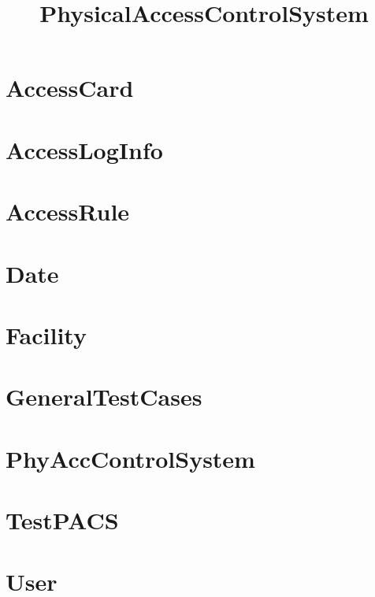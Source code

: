 \documentclass{article}
\begin{document}
\title{PhysicalAccessControlSystem}
\author{}
\maketitle
\tableofcontents

\section{AccessCard}

\section{AccessLogInfo}

\section{AccessRule}

\section{Date}

\section{Facility}

\section{GeneralTestCases}

\section{PhyAccControlSystem}

\section{TestPACS}

\section{User}

\end{document}
